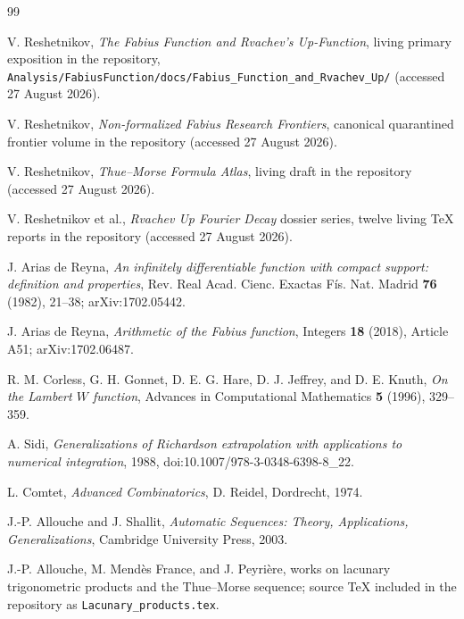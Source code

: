 \documentclass[11pt]{article}
\numberwithin{equation}{section}
\theoremstyle{definition}
\theoremstyle{remark}
\begin{document}
\begin{thebibliography}{99}

V. Reshetnikov,
\emph{The Fabius Function and Rvachev's Up-Function},
living primary exposition in the \repoPartll{} repository,
\texttt{Analysis/FabiusFunction/docs/Fabius\_Function\_and\_Rvachev\_Up/} (accessed 27 August 2026).

V. Reshetnikov,
\emph{Non-formalized Fabius Research Frontiers},
canonical quarantined frontier volume in the \repoPartll{} repository
(accessed 27 August 2026).

V. Reshetnikov,
\emph{Thue--Morse Formula Atlas},
living draft in the \repoPartll{} repository
(accessed 27 August 2026).

V. Reshetnikov et al.,
\emph{Rvachev Up Fourier Decay} dossier series,
twelve living TeX reports in the \repoPartll{} repository
(accessed 27 August 2026).

J. Arias de Reyna,
\emph{An infinitely differentiable function with compact support: definition and properties},
Rev. Real Acad. Cienc. Exactas F\'is. Nat. Madrid \textbf{76} (1982), 21--38;
arXiv:1702.05442.

J. Arias de Reyna,
\emph{Arithmetic of the Fabius function},
Integers \textbf{18} (2018), Article A51;
arXiv:1702.06487.

R. M. Corless, G. H. Gonnet, D. E. G. Hare, D. J. Jeffrey, and D. E. Knuth,
\emph{On the Lambert $W$ function},
Advances in Computational Mathematics \textbf{5} (1996), 329--359.

A. Sidi,
\emph{Generalizations of Richardson extrapolation with applications to numerical integration},
1988, doi:10.1007/978-3-0348-6398-8\_22.

L. Comtet,
\emph{Advanced Combinatorics},
D. Reidel, Dordrecht, 1974.

J.-P. Allouche and J. Shallit,
\emph{Automatic Sequences: Theory, Applications, Generalizations},
Cambridge University Press, 2003.

J.-P. Allouche, M. Mend\`es France, and J. Peyri\`ere,
works on lacunary trigonometric products and the Thue--Morse sequence;
source TeX included in the repository as \texttt{Lacunary\_products.tex}.

\end{thebibliography}
\end{document}
